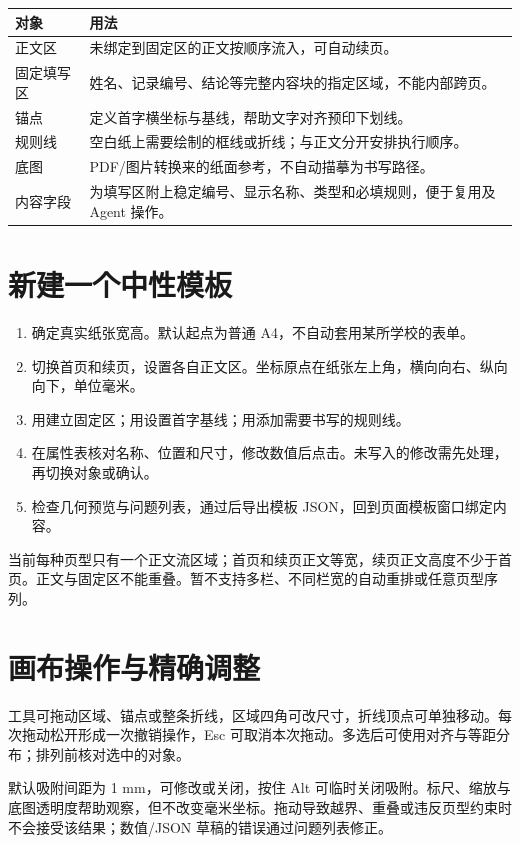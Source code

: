 \par\noindent\begin{tabularx}{\linewidth}{@{}P{32mm}Y@{}}
\toprule
对象 & 用法\\\midrule
正文区 & 未绑定到固定区的正文按顺序流入，可自动续页。\\
固定填写区 & 姓名、记录编号、结论等完整内容块的指定区域，不能内部跨页。\\
锚点 & 定义首字横坐标与基线，帮助文字对齐预印下划线。\\
规则线 & 空白纸上需要绘制的框线或折线；与正文分开安排执行顺序。\\
底图 & PDF/图片转换来的纸面参考，不自动描摹为书写路径。\\
内容字段 & 为填写区附上稳定编号、显示名称、类型和必填规则，便于复用及 Agent 操作。\\
\bottomrule
\end{tabularx}

\section{新建一个中性模板}
\begin{enumerate}
\item 确定真实纸张宽高。默认起点为普通 A4，不自动套用某所学校的表单。
\item 切换首页和续页，设置各自正文区。坐标原点在纸张左上角，横向向右、纵向向下，单位毫米。
\item 用建立固定区；用设置首字基线；用添加需要书写的规则线。
\item 在属性表核对名称、位置和尺寸，修改数值后点击。未写入的修改需先处理，再切换对象或确认。
\item 检查几何预览与问题列表，通过后导出模板 JSON，回到页面模板窗口绑定内容。
\end{enumerate}

当前每种页型只有一个正文流区域；首页和续页正文等宽，续页正文高度不少于首页。正文与固定区不能重叠。暂不支持多栏、不同栏宽的自动重排或任意页型序列。

\section{画布操作与精确调整}
工具可拖动区域、锚点或整条折线，区域四角可改尺寸，折线顶点可单独移动。每次拖动松开形成一次撤销操作，Esc 可取消本次拖动。多选后可使用对齐与等距分布；排列前核对选中的对象。

默认吸附间距为 1 mm，可修改或关闭，按住 Alt 可临时关闭吸附。标尺、缩放与底图透明度帮助观察，但不改变毫米坐标。拖动导致越界、重叠或违反页型约束时不会接受该结果；数值/JSON 草稿的错误通过问题列表修正。

